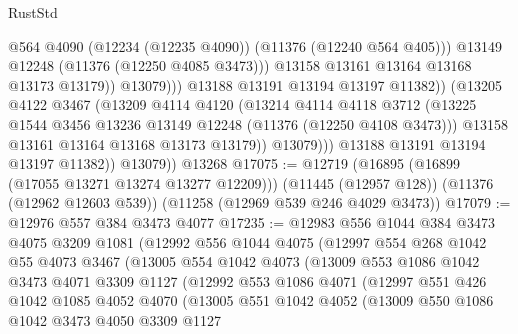 \begin{lexlean}{RustStd}
\begin{coremodule}
{\begin{coremodule}
{{{{{{{{{{{{{{{{{{{{{{{{{{{{{{{{{{{{{{{{{{{{{{{{{{{{{{{{{{{{{{{{{{{{{{{{{{{{{{{{{{{{{                                  @564
                                  @4090
                                  (@12234 (@12235 @4090))
                                  (@11376 (@12240 @564 @405)))
                                @13149
                                @12248
                                (@11376 (@12250 @4085 @3473)))
                              @13158
                              @13161
                              @13164
                              @13168
                              @13173
                              @13179))
                          @13079)))
                    @13188
                    @13191
                    @13194
                    @13197
                    @11382))
                (@13205
                  @4122
                  @3467
                  (@13209
                    @4114
                    @4120
                    (@13214
                      @4114
                      @4118
                      @3712
                      (@13225 @1544 @3456 @13236 @13149 @12248 (@11376 (@12250 @4108 @3473)))
                      @13158
                      @13161
                      @13164
                      @13168
                      @13173
                      @13179))
                  @13079)))
            @13188
            @13191
            @13194
            @13197
            @11382))
        @13079))
    @13268
@17075 := @12719
    (@16895 (@16899 (@17055 @13271 @13274 @13277 @12209)))
    (@11445 (@12957 @128))
    (@11376 (@12962 @12603 @539))
    (@11258 (@12969 @539 @246 @4029 @3473))
@17079 := @12976 @557 @384 @3473 @4077
@17235 := @12983
    @556
    @1044
    @384
    @3473
    @4075
    @3209
    @1081
    (@12992
      @556
      @1044
      @4075
      (@12997
        @554
        @268
        @1042
        @55
        @4073
        @3467
        (@13005
          @554
          @1042
          @4073
          (@13009
            @553
            @1086
            @1042
            @3473
            @4071
            @3309
            @1127
            (@12992
              @553
              @1086
              @4071
              (@12997
                @551
                @426
                @1042
                @1085
                @4052
                @4070
                (@13005
                  @551
                  @1042
                  @4052
                  (@13009
                    @550
                    @1086
                    @1042
                    @3473
                    @4050
                    @3309
                    @1127
}}}}}}}}}}}}}}}}}}}}}}}}}}}}}}}}}}}}}}}}}}}}}}}}}}}}}}}}}}}}}}}}}}}}}}}}}}}}}}}}}}}}}
\end{coremodule}}
\end{coremodule}
\end{lexlean}
